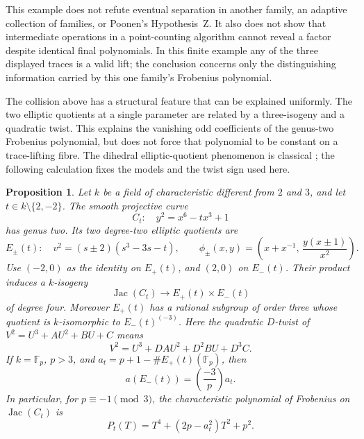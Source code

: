 \documentclass[11pt]{article}
\newtheorem{proposition}[theorem]{Proposition}
\theoremstyle{definition}
\theoremstyle{remark}
\begin{document}
This example does not refute eventual separation in another family,
an adaptive collection of families, or Poonen's Hypothesis~Z. It also
does not show that intermediate operations in a point-counting
algorithm cannot reveal a factor despite identical final polynomials.
In this finite example any of the three displayed traces is a valid
lift; the conclusion concerns only the distinguishing information
carried by this one family's Frobenius polynomial.



The collision above has a structural feature that can be explained
uniformly. The two elliptic quotients at a single parameter are related
by a three-isogeny and a quadratic twist. This explains the vanishing
odd coefficients of the genus-two Frobenius polynomial, but does not
force that polynomial to be constant on a trace-lifting fibre.
The dihedral elliptic-quotient phenomenon is classical
\citep[Proposition~5.1, author pp.~19--20]{CardonaQuer2002};
the following calculation fixes the models and the twist sign used here.

\begin{proposition}\label{prop:genus-two-quotient-twist}
Let \(k\) be a field of characteristic different from \(2\) and \(3\),
and let \(t\in k\setminus\{2,-2\}\). The smooth projective curve
\[
 C_t:\quad y^2=x^6-tx^3+1
\]
has genus two. Its two degree-two elliptic quotients are
\[
 E_\pm(t):\quad v^2=(s\pm2)(s^3-3s-t),
 \qquad
 \phi_\pm(x,y)=\left(x+x^{-1},\,\frac{y(x\pm1)}{x^2}\right).
\]
Use \((-2,0)\) as the identity on \(E_+(t)\), and \((2,0)\) on
\(E_-(t)\). Their product induces a \(k\)-isogeny
\[
 \operatorname{Jac}(C_t)\longrightarrow E_+(t)\times E_-(t)
\]
of degree four. Moreover \(E_+(t)\) has a rational subgroup of order
three whose quotient is \(k\)-isomorphic to \(E_-(t)^{(-3)}\).
Here the quadratic \(D\)-twist of
\(V^2=U^3+A U^2+B U+C\) means
\[
 V^2=U^3+D A U^2+D^2B U+D^3C.
\]
If \(k=\mathbb F_p\), \(p>3\), and
\(a_t=p+1-\#E_+(t)(\mathbb F_p)\), then
\[
 a(E_-(t))=\left(\frac{-3}{p}\right)a_t.
\]
In particular, for \(p\equiv-1\pmod3\), the characteristic polynomial
of Frobenius on \(\operatorname{Jac}(C_t)\) is
\[
 P_t(T)=T^4+(2p-a_t^2)T^2+p^2.
\]
\end{proposition}
\end{document}
